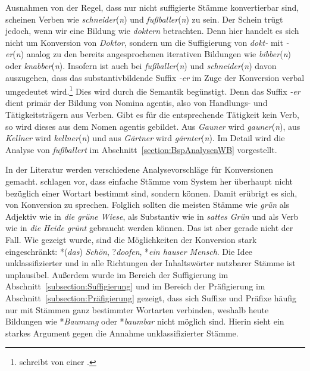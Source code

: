 Ausnahmen von der Regel, dass nur nicht suffigierte Stämme konvertierbar sind, scheinen Verben wie \textit{schneider}(\textit{n}) und \textit{fußballer}(\textit{n}) zu sein. Der Schein trügt jedoch, wenn wir eine Bildung wie \textit{doktern} betrachten. Denn hier handelt es sich nicht um Konversion von \textit{Doktor}, sondern um die Suffigierung von \textit{dokt-} mit \textit{-er}(\textit{n}) analog zu den bereits angesprochenen iterativen Bildungen wie \textit{bibber}(\textit{n}) oder \textit{knabber}(\textit{n}). Insofern ist auch bei \textit{fußballer}(\textit{n}) und \textit{schneider}(\textit{n}) davon auszugehen, dass das substantivbildende Suffix \textit{-er} im Zuge der Konversion verbal umgedeutet wird.\footnote{\citet[174]{Marchand1963} schreibt von einer .} Dies wird durch die Semantik begünstigt. Denn das Suffix \textit{-er} dient primär der Bildung von Nomina agentis, also von Handlungs- und Tätigkeitsträgern aus Verben. Gibt es für die entsprechende Tätigkeit kein Verb, so wird dieses aus dem Nomen agentis gebildet. Aus \textit{Gauner} wird \textit{gauner}(\textit{n}), aus \textit{Kellner} wird \textit{kellner}(\textit{n}) und aus \textit{Gärtner} wird \textit{gärnter}(\textit{n}). Im Detail wird die Analyse von \textit{fußballert} im Abschnitt~\ref{section:BspAnalysenWB} vorgestellt.

In der Literatur werden verschiedene Analysevorschläge für Konversionen gemacht. \citet[347]{Bergenholtz_Mugdan1979} schlagen vor, dass einfache Stämme vom System her überhaupt nicht bezüglich einer Wortart bestimmt sind, sondern  können. Damit erübrigt es sich, von Konversion zu sprechen. Folglich sollten die meisten Stämme wie \textit{grün} als Adjektiv wie in \textit{die grüne Wiese}, als Substantiv wie in \textit{sattes Grün} und als Verb wie in \textit{die Heide grünt} gebraucht werden können. Das ist aber gerade nicht der Fall. Wie gezeigt wurde, sind die Möglichkeiten der Konversion stark eingeschränkt: *(\textit{das}) \textit{Schön}, ?\textit{doofen}, *\textit{ein hauser Mensch}. Die Idee unklassifizierter und in alle Richtungen der Inhaltswörter nutzbarer Stämme ist unplausibel. Außerdem wurde im Bereich der Suffigierung im Abschnitt~\ref{subsection:Suffigierung} und im Bereich der Präfigierung im Abschnitt~\ref{subsection:Präfigierung} gezeigt, dass sich Suffixe und Präfixe häufig nur mit Stämmen ganz bestimmter Wortarten verbinden, weshalb heute Bildungen wie *\textit{Baumung} oder *\textit{baumbar} nicht möglich sind. Hierin sieht \citet[188]{Olsen1990Head} ein starkes Argument gegen die Annahme unklassifizierter Stämme.   

